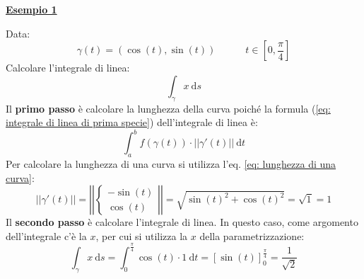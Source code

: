 \documentclass[a4paper]{article}
\newcommand{\example}[1]{\textcolor{Green4}{\textbf{#1}}}
\begin{document}
	\begin{flushleft}
		\example{\underline{Esempio 1}}
	\end{flushleft}
	Data:
	\begin{equation*}
		\gamma\left(t\right) = \left(\cos\left(t\right), \sin\left(t\right)\right) \hspace{3em} t \in \left[0, \dfrac{\pi}{4}\right]
	\end{equation*}
	Calcolare l'integrale di linea:
	\begin{equation*}
		\displaystyle\int_{\gamma} x \:\mathrm{d}s
	\end{equation*}
	Il \textbf{primo passo} è calcolare la lunghezza della curva poiché la formula (\ref{eq: integrale di linea di prima specie}) dell'integrale di linea è:
	\begin{equation*}
		\displaystyle\int_{a}^{b} f\left(\gamma\left(t\right)\right) \cdot \left|\left| \gamma'\left(t\right) \right|\right| \:\mathrm{d}t
	\end{equation*}
	Per calcolare la lunghezza di una curva si utilizza l'eq. \ref{eq: lunghezza di una curva}:
	\begin{equation*}
		\left|\left| \gamma'\left(t\right) \right|\right| =
		\left|\left| \begin{cases}
			-\sin\left(t\right) \\
			\cos\left(t\right)
		\end{cases} \right|\right| =
		\sqrt{\sin\left(t\right)^{2} + \cos\left(t\right)^{2}} =
		\sqrt{1} = 1
	\end{equation*}
	Il \textbf{secondo passo} è calcolare l'integrale di linea. In questo caso, come argomento dell'integrale c'è la $x$, per cui si utilizza la $x$ della parametrizzazione:
	\begin{equation*}
		\displaystyle\int_{\gamma} x \:\mathrm{d}s = \displaystyle\int_{0}^{\frac{\pi}{4}} \cos\left(t\right) \cdot 1 \:\mathrm{d}t = \left[\sin\left(t\right)\right]_{0}^{\frac{\pi}{4}} = \dfrac{1}{\sqrt{2}}
	\end{equation*}\newpage
\end{document}
